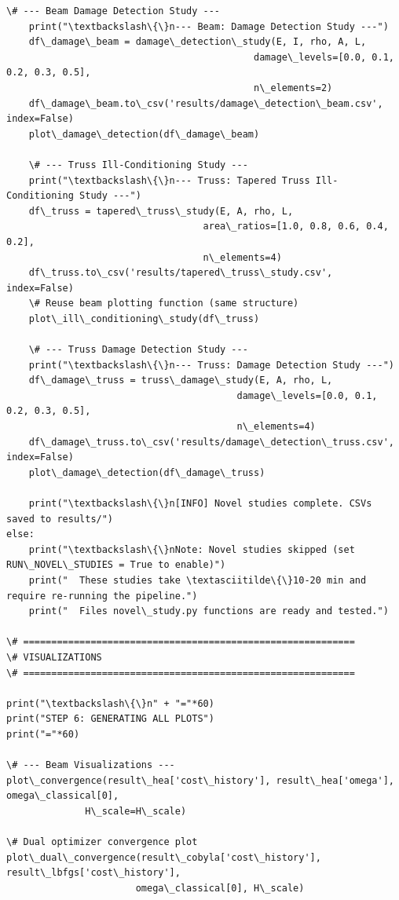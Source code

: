 \documentclass[12pt, a4paper]{article}
\begin{document}
\begin{lstlisting}[style=codestyle, caption={{main.py --- Pipeline Orchestrator}}]
    \# --- Beam Damage Detection Study ---
    print("\textbackslash\{\}n--- Beam: Damage Detection Study ---")
    df\_damage\_beam = damage\_detection\_study(E, I, rho, A, L,
                                            damage\_levels=[0.0, 0.1, 0.2, 0.3, 0.5],
                                            n\_elements=2)
    df\_damage\_beam.to\_csv('results/damage\_detection\_beam.csv', index=False)
    plot\_damage\_detection(df\_damage\_beam)

    \# --- Truss Ill-Conditioning Study ---
    print("\textbackslash\{\}n--- Truss: Tapered Truss Ill-Conditioning Study ---")
    df\_truss = tapered\_truss\_study(E, A, rho, L,
                                   area\_ratios=[1.0, 0.8, 0.6, 0.4, 0.2],
                                   n\_elements=4)
    df\_truss.to\_csv('results/tapered\_truss\_study.csv', index=False)
    \# Reuse beam plotting function (same structure)
    plot\_ill\_conditioning\_study(df\_truss)

    \# --- Truss Damage Detection Study ---
    print("\textbackslash\{\}n--- Truss: Damage Detection Study ---")
    df\_damage\_truss = truss\_damage\_study(E, A, rho, L,
                                         damage\_levels=[0.0, 0.1, 0.2, 0.3, 0.5],
                                         n\_elements=4)
    df\_damage\_truss.to\_csv('results/damage\_detection\_truss.csv', index=False)
    plot\_damage\_detection(df\_damage\_truss)

    print("\textbackslash\{\}n[INFO] Novel studies complete. CSVs saved to results/")
else:
    print("\textbackslash\{\}nNote: Novel studies skipped (set RUN\_NOVEL\_STUDIES = True to enable)")
    print("  These studies take \textasciitilde\{\}10-20 min and require re-running the pipeline.")
    print("  Files novel\_study.py functions are ready and tested.")

\# ===========================================================
\# VISUALIZATIONS
\# ===========================================================

print("\textbackslash\{\}n" + "="*60)
print("STEP 6: GENERATING ALL PLOTS")
print("="*60)

\# --- Beam Visualizations ---
plot\_convergence(result\_hea['cost\_history'], result\_hea['omega'], omega\_classical[0],
              H\_scale=H\_scale)

\# Dual optimizer convergence plot
plot\_dual\_convergence(result\_cobyla['cost\_history'], result\_lbfgs['cost\_history'],
                       omega\_classical[0], H\_scale)


\end{lstlisting}
\end{document}
